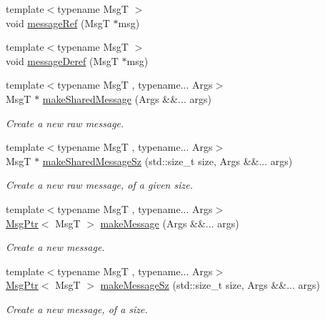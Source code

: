 \begin{DoxyCompactItemize}
{\footnotesize template$<$typename MsgT $>$ }\\void \hyperlink{namespacevt_aa4a692a62fffd91e7e708d8047897a60}{message\+Ref} (MsgT $\ast$msg)
\item 
{\footnotesize template$<$typename MsgT $>$ }\\void \hyperlink{namespacevt_a85f2aa61b92eeeedc61654cd4865b2a9}{message\+Deref} (MsgT $\ast$msg)
\item 
{\footnotesize template$<$typename MsgT , typename... Args$>$ }\\MsgT $\ast$ \hyperlink{namespacevt_a6c87ed02a655497ee05109f3c50374fd}{make\+Shared\+Message} (Args \&\&... args)
\begin{DoxyCompactList}\small\item\em Create a new \textquotesingle{}raw\textquotesingle{} message. \end{DoxyCompactList}\item 
{\footnotesize template$<$typename MsgT , typename... Args$>$ }\\MsgT $\ast$ \hyperlink{namespacevt_a1cad9543b26045826f0fa5d17a2dfd2f}{make\+Shared\+Message\+Sz} (std\+::size\+\_\+t size, Args \&\&... args)
\begin{DoxyCompactList}\small\item\em Create a new \textquotesingle{}raw\textquotesingle{} message, of a given size. \end{DoxyCompactList}\item 
{\footnotesize template$<$typename MsgT , typename... Args$>$ }\\\hyperlink{namespacevt_a9f5ebd62ee9d6dd8829e3e1cc4f858e9}{Msg\+Ptr}$<$ MsgT $>$ \hyperlink{namespacevt_a948c0bbe39c34326b5453065a461ebaa}{make\+Message} (Args \&\&... args)
\begin{DoxyCompactList}\small\item\em Create a new message. \end{DoxyCompactList}\item 
{\footnotesize template$<$typename MsgT , typename... Args$>$ }\\\hyperlink{namespacevt_a9f5ebd62ee9d6dd8829e3e1cc4f858e9}{Msg\+Ptr}$<$ MsgT $>$ \hyperlink{namespacevt_a02d4a45f1b229ac6fd5da4bf289d6654}{make\+Message\+Sz} (std\+::size\+\_\+t size, Args \&\&... args)
\begin{DoxyCompactList}\small\item\em Create a new message, of a size. \end{DoxyCompactList}\item 

\end{DoxyCompactItemize}
